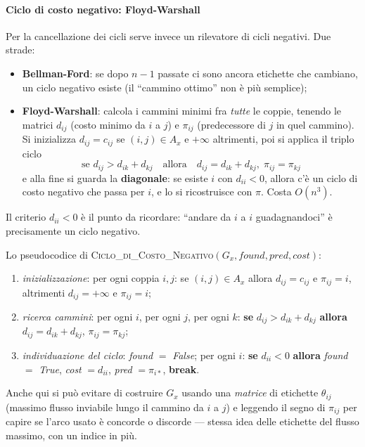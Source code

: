 \documentclass[12pt]{extarticle} %
\begin{document}
\paragraph{Ciclo di costo negativo: Floyd-Warshall}
Per la cancellazione dei cicli serve invece un rilevatore di cicli negativi. Due strade:
\begin{itemize}
    \item \textbf{Bellman-Ford}: se dopo $n-1$ passate ci sono ancora etichette che cambiano, un ciclo negativo esiste (il ``cammino ottimo'' non è più semplice);
    \item \textbf{Floyd-Warshall}: calcola i cammini minimi fra \emph{tutte} le coppie, tenendo le matrici $d_{ij}$ (costo minimo da $i$ a $j$) e $\pi_{ij}$ (predecessore di $j$ in quel cammino). Si inizializza $d_{ij} = c_{ij}$ se $(i,j) \in A_x$ e $+\infty$ altrimenti, poi si applica il triplo ciclo
    \[
    \text{se } d_{ij} > d_{ik} + d_{kj} \quad\text{allora}\quad d_{ij} = d_{ik}+d_{kj},\; \pi_{ij} = \pi_{kj}
    \]
    e alla fine si guarda la \textbf{diagonale}: se esiste $i$ con $d_{ii} < 0$, allora c'è un ciclo di costo negativo che passa per $i$, e lo si ricostruisce con $\pi$. Costa $O(n^3)$.
\end{itemize}
\noindent Il criterio $d_{ii} < 0$ è il punto da ricordare: ``andare da $i$ a $i$ guadagnandoci'' è precisamente un ciclo negativo.

\noindent Lo pseudocodice di \textsc{Ciclo\_di\_Costo\_Negativo}$(G_x,\textit{found},\textit{pred},\textit{cost})$:
\begin{enumerate}
    \item \emph{inizializzazione}: per ogni coppia $i,j$: se $(i,j) \in A_x$ allora $d_{ij} = c_{ij}$ e $\pi_{ij} = i$, altrimenti $d_{ij} = +\infty$ e $\pi_{ij} = i$;
    \item \emph{ricerca cammini}: per ogni $i$, per ogni $j$, per ogni $k$: \textbf{se} $d_{ij} > d_{ik} + d_{kj}$ \textbf{allora} $d_{ij} = d_{ik}+d_{kj}$, $\pi_{ij} = \pi_{kj}$;
    \item \emph{individuazione del ciclo}: \textit{found} $=$ \textit{False}; per ogni $i$: \textbf{se} $d_{ii} < 0$ \textbf{allora} \textit{found} $=$ \textit{True}, \textit{cost} $= d_{ii}$, \textit{pred} $= \pi_{i\ast}$, \textbf{break}.
\end{enumerate}
\noindent Anche qui si può evitare di costruire $G_x$ usando una \emph{matrice} di etichette $\theta_{ij}$ (massimo flusso inviabile lungo il cammino da $i$ a $j$) e leggendo il segno di $\pi_{ij}$ per capire se l'arco usato è concorde o discorde --- stessa idea delle etichette del flusso massimo, con un indice in più.
\end{document}
